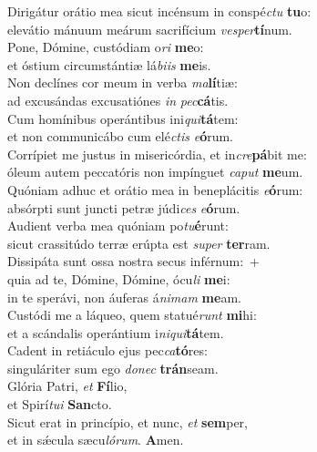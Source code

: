 \evenverse Dirigátur orátio mea sicut incénsum in conspé\textit{ctu} \textbf{tu}o:~\*\\
\evenverse elevátio mánuum meárum sacrifícium \textit{ve}\textit{sper}\textbf{tí}num.\\
\oddverse Pone, Dómine, custódiam o\textit{ri} \textbf{me}o:~\*\\
\oddverse et óstium circumstántiæ lá\textit{bi}\textit{is} \textbf{me}is.\\
\evenverse Non declínes cor meum in verba \textit{ma}\textbf{lí}tiæ:~\*\\
\evenverse ad excusándas excusatiónes \textit{in} \textit{pec}\textbf{cá}tis.\\
\oddverse Cum homínibus operántibus ini\textit{qui}\textbf{tá}tem:~\*\\
\oddverse et non communicábo cum elé\textit{ctis} \textit{e}\textbf{ó}rum.\\
\evenverse Corrípiet me justus in misericórdia, et in\textit{cre}\textbf{pá}bit me:~\*\\
\evenverse óleum autem peccatóris non impínguet \textit{ca}\textit{put} \textbf{me}um.\\
\oddverse Quóniam adhuc et orátio mea in beneplácitis \textit{e}\textbf{ó}rum:~\*\\
\oddverse absórpti sunt juncti petræ júdi\textit{ces} \textit{e}\textbf{ó}rum.\\
\evenverse Audient verba mea quóniam po\textit{tu}\textbf{é}runt:~\*\\
\evenverse sicut crassitúdo terræ erúpta est \textit{su}\textit{per} \textbf{ter}ram.\\
\oddverse Dissipáta sunt ossa nostra secus inférnum:~+\\
\oddverse  quia ad te, Dómine, Dómine, ócu\textit{li} \textbf{me}i:~\*\\
\oddverse in te sperávi, non áuferas á\textit{ni}\textit{mam} \textbf{me}am.\\
\evenverse Custódi me a láqueo, quem statué\textit{runt} \textbf{mi}hi:~\*\\
\evenverse et a scándalis operántium i\textit{ni}\textit{qui}\textbf{tá}tem.\\
\oddverse Cadent in retiáculo ejus pec\textit{ca}\textbf{tó}res:~\*\\
\oddverse singuláriter sum ego \textit{do}\textit{nec} \textbf{trán}seam.\\
\evenverse Glória Patri, \textit{et} \textbf{Fí}lio,~\*\\
\evenverse et Spirí\textit{tu}\textit{i} \textbf{San}cto.\\
\oddverse Sicut erat in princípio, et nunc, \textit{et} \textbf{sem}per,~\*\\
\oddverse et in sǽcula sæcu\textit{ló}\textit{rum}. \textbf{A}men.\\
